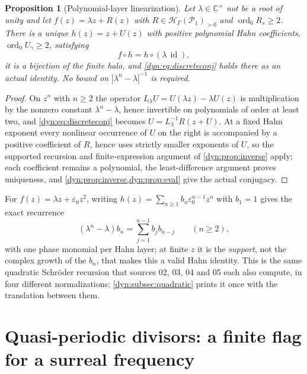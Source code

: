 \documentclass[11pt,letterpaper]{article}
\newtheorem{proposition}[proposition]{Proposition}
\theoremstyle{definition}
\theoremstyle{remark}
\newcommand{\C}{\mathbb C}
\newcommand{\HH}{\mathscr H}
\newcommand{\PP}{\mathscr P}
\newcommand{\id}{\operatorname{id}}
\newcommand{\ord}{\operatorname{ord}}
\newcommand{\eps}{\varepsilon}
\numberwithin{equation}{section}
\begin{document}
\begin{proposition}[Polynomial-layer linearization]\label{dyn:prop:discrete}
Let $\lambda\in\C^{\times}$ not be a root of unity and let
$f(z)=\lambda z+R(z)$ with $R\in\HH_\Gamma(\PP_1)_{>0}$ and
$\ord_0R_s\ge2$. There is a unique $h(z)=z+U(z)$ with positive polynomial
Hahn coefficients, $\ord_0U_\gamma\ge2$, satisfying
\begin{equation}\label{dyn:eq:discreteconj}
 f\circ h=h\circ(\lambda\,\id),
\end{equation}
it is a bijection of the finite halo, and
\eqref{dyn:eq:discreteconj} holds there as an actual identity. \emph{No}
bound on $|\lambda^{n}-\lambda|^{-1}$ is required.
\end{proposition}
\begin{proof}
On $z^{n}$ with $n\ge2$ the operator $L_\lambda U=U(\lambda z)-\lambda U(z)$
is multiplication by the nonzero constant $\lambda^{n}-\lambda$, hence
invertible on polynomials of order at least two, and
\eqref{dyn:eq:discreteconj} becomes $U=L_\lambda^{-1}R(z+U)$. At a fixed
Hahn exponent every nonlinear occurrence of $U$ on the right is accompanied
by a positive coefficient of $R$, hence uses strictly smaller exponents of
$U$, so the supported recursion and finite-expression argument of
\cref{dyn:prop:inverse} apply; each coefficient remains a polynomial, the
least-difference argument proves uniqueness, and
\cref{dyn:prop:inverse,dyn:prop:eval} give the actual conjugacy.
\end{proof}

For $f(z)=\lambda z+\eps_0z^{2}$, writing
$h(z)=\sum_{n\ge1}b_n\eps_0^{n-1}z^{n}$ with $b_1=1$ gives the exact
recurrence
\begin{equation}\label{dyn:eq:discreterec}
 (\lambda^{n}-\lambda)b_n=\sum_{j=1}^{n-1}b_jb_{n-j}\qquad(n\ge2),
\end{equation}
with one phase monomial per Hahn layer; at finite $z$ it is the
\emph{support}, not the complex growth of the $b_n$, that makes this a
valid Hahn identity. This is the same quadratic Schr\"oder recursion that
sources 02, 03, 04 and 05 each also compute, in four different
normalizations; \cref{dyn:subsec:quadratic} prints it once with the
translation between them.

\section{Quasi-periodic divisors: a finite flag for a surreal frequency}
\label{dyn:sec:flag}
\end{document}
